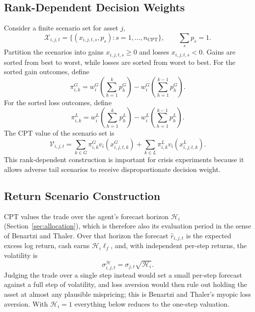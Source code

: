 \documentclass[12pt, a4paper]{article}
\begin{document}
    \subsection{Rank-Dependent Decision Weights}

    Consider a finite scenario set for asset \(j\),
    \[
        \mathcal{X}_{i,j,t}=\{(x_{i,j,t,s},p_s):s=1,\ldots,n_{\mathrm{CPT}}\},
        \qquad
        \sum_s p_s=1.
    \]
    Partition the scenarios into gains \(x_{i,j,t,s}\ge 0\) and losses
    \(x_{i,j,t,s}<0\). Gains are sorted from best to worst, while losses are sorted
    from worst to best. For the sorted gain outcomes, define
    \[
        \pi_{i,k}^{G}
        =
        w_i^G\!\left(\sum_{h=1}^{k}p_h^{G}\right)
        -
        w_i^G\!\left(\sum_{h=1}^{k-1}p_h^{G}\right).
    \]
    For the sorted loss outcomes, define
    \[
        \pi_{i,k}^{L}
        =
        w_i^L\!\left(\sum_{h=1}^{k}p_h^{L}\right)
        -
        w_i^L\!\left(\sum_{h=1}^{k-1}p_h^{L}\right).
    \]
    The CPT value of the scenario set is
    \[
        \mathcal{V}_{i,j,t}
        =
        \sum_{k\in G}\pi_{i,k}^{G}v_i(x_{i,j,t,k}^{G})
        +
        \sum_{k\in L}\pi_{i,k}^{L}v_i(x_{i,j,t,k}^{L}).
    \]
    This rank-dependent construction is important for crisis experiments because it
    allows adverse tail scenarios to receive disproportionate decision weight.

    \subsection{Return Scenario Construction}\label{sec:cpt_scenarios}

    CPT values the trade over the agent's forecast horizon \(\mathcal H_i\)
    (Section~\ref{sec:allocation}), which is therefore also its evaluation period
    in the sense of Benartzi and Thaler. Over that horizon the forecast
    \(\hat r_{i,j,t}\) is the expected excess log return, cash earns
    \(\mathcal H_i\ell_f\), and, with independent per-step returns, the volatility
    is
    \[
        \sigma_{i,j,t}^{\mathcal H}=\sigma_{j,t}\sqrt{\mathcal H_i}.
    \]
    Judging the trade over a single step instead would set a small per-step
    forecast against a full step of volatility, and loss aversion would then rule
    out holding the asset at almost any plausible mispricing; this is Benartzi and
    Thaler's myopic loss aversion. With \(\mathcal H_i=1\) everything below
    reduces to the one-step valuation.
\end{document}
